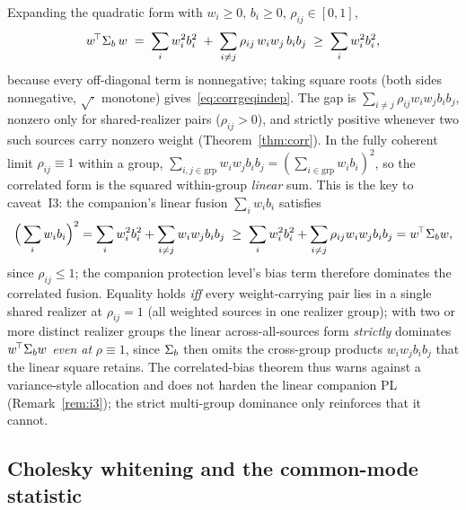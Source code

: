 Expanding the quadratic form with $w_i\ge0$, $b_i\ge0$, $\rho_{ij}\in[0,1]$,
\begin{equation}
  w^{\!\top}\Sigma_{b}{}\,w
  \;=\; \sum_i w_i^2 b_i^2 \;+\; \sum_{i\neq j} \rho_{ij}\,w_i w_j\,b_i b_j
  \;\ge\; \sum_i w_i^2 b_i^2,
  \label{eq:expand}
\end{equation}
because every off-diagonal term is nonnegative; taking square roots (both sides
nonnegative, $\sqrt{\cdot}$ monotone) gives~\eqref{eq:corrgeqindep}. The gap is
$\sum_{i\neq j}\rho_{ij}w_iw_jb_ib_j$, nonzero only for shared-realizer pairs
($\rho_{ij}>0$), and strictly positive whenever two such sources carry nonzero
weight (Theorem~\ref{thm:corr}). In the fully coherent limit $\rho_{ij}\equiv1$
within a group, $\sum_{i,j\in\text{grp}}w_iw_jb_ib_j=(\sum_{i\in\text{grp}}w_ib_i)^2$,
so the correlated form is the squared within-group \emph{linear} sum. This is the
key to caveat~I3: the companion's linear fusion $\sum_i w_i b_i$ satisfies
\begin{equation}
  \Big(\sum_i w_i b_i\Big)^2
  = \sum_i w_i^2 b_i^2 + \sum_{i\neq j} w_i w_j b_i b_j
  \;\ge\; \sum_i w_i^2 b_i^2 + \sum_{i\neq j}\rho_{ij} w_i w_j b_i b_j
  = w^{\!\top}\Sigma_{b}{}w,
  \label{eq:lindominates}
\end{equation}
since $\rho_{ij}\le1$; the companion protection level's bias term therefore
dominates the correlated fusion. Equality holds \emph{iff} every weight-carrying
pair lies in a single shared realizer at $\rho_{ij}=1$ (all weighted sources in one
realizer group); with two or more distinct realizer groups the linear
across-all-sources form \emph{strictly} dominates $w^{\!\top}\Sigma_{b}{}w$ \emph{even at}
$\rho\equiv1$, since $\Sigma_{b}{}$ then omits the cross-group products $w_iw_jb_ib_j$ that
the linear square retains. The correlated-bias theorem thus warns against a
variance-style allocation and does not harden the linear companion PL
(Remark~\ref{rem:i3}); the strict multi-group dominance only reinforces that it
cannot.

\subsection{Cholesky whitening and the common-mode statistic}
\label{app:cmstat}

